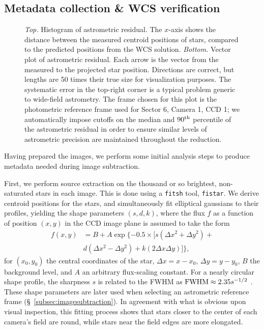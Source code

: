 \documentclass[12pt,twocolumn,tighten]{aastex62}
\begin{document}
\subsection{Metadata collection \& WCS verification}
\label{subsec:metadatacollection}

\begin{figure}[!t]
	\vspace{-0.8cm}
	\vspace{-0.8cm}
    \caption{
		{\it Top.} Histogram of astrometric residual. The $x$-axis shows 
		the distance between the measured centroid positions of stars, 
		compared to the predicted positions from the WCS solution.
    {\it Bottom.} Vector plot of astrometric residual. Each arrow is
    the vector from the measured to the projected star position.
    Directions are correct, but lengths are 50 times their true size
    for visualization purposes.  The systematic error in the top-right
    corner is a typical problem generic to wide-field astrometry.  The
    frame chosen for this plot is the photometric reference frame used
    for Sector 6, Camera 1, CCD 1; we automatically impose cutoffs on
    the median and $90^{\rm th}$ percentile of the astrometric
    residual in order to ensure similar levels of astrometric
    precision are maintained throughout the reduction.
	}
	\label{fig:astromresid}
\end{figure}

Having prepared the images, we perform some initial analysis steps to
produce metadata needed during image subtraction.  

First, we perform source extraction on the thousand or so brightest,
non-saturated stars in each image.  This is done using a
\texttt{fitsh} tool, \texttt{fistar}.  We derive centroid positions
for the stars, and simultaneously fit elliptical gaussians to their
profiles, yielding the shape parameters $(s,d,k)$, where the flux $f$
as a function of position $(x,y)$ in the CCD image plane is assumed to
take the form
\begin{align}
  f(x,y) &= B + A \exp \{ -0.5 \times [
    s(\Delta x^2 + \Delta y^2) + \\
    \nonumber
    &d(\Delta x^2 - \Delta y^2) +
    k(2\Delta x \Delta y)
  ]  \},
\end{align}
for $(x_0,y_0)$ the central coordinates of the star, $\Delta x =
x-x_0$, $\Delta y = y - y_0$, $B$ the background level, and $A$ an
arbitrary flux-scaling constant.  For a nearly circular shape profile,
the sharpness $s$ is related to the FWHM as ${\rm FWHM} \approx
2.35s^{-1/2}$ \citep[{\it e.g.},][]{Pal_2009}.  These shape parameters
are later used when selecting an astrometric reference frame
(\S~\ref{subsec:imagesubtraction}).  In agreement with what is obvious
upon visual inspection, this fitting process shows that stars closer
to the center of each camera's field are round, while stars near the
field edges are more elongated.
\end{document}

